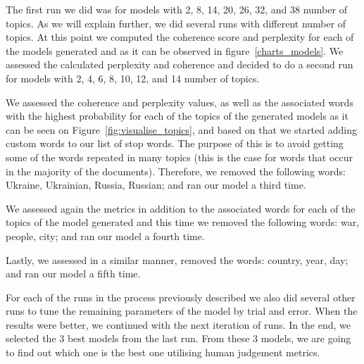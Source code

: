 \documentclass[twoside,12pt,a4paper]{article}
\begin{document}
The first run we did was for models with 2, 8, 14, 20, 26, 32, and 38 number of topics. As we will explain further, we did several runs with different number of topics. At this point we computed the coherence score and perplexity for each of the models generated and as it can be observed in figure~\ref{charts_models}. We assessed the calculated perplexity and coherence and decided to do a second run for models with 2, 4, 6, 8, 10, 12, and 14 number of topics. 

We assessed the coherence and perplexity values, as well as the associated words with the highest probability for each of the topics of the generated models as it can be seen on Figure~\ref{fig:visualise_topics}, and based on that we started adding custom words to our list of stop words. The purpose of this is to avoid getting some of the words repeated in many topics (this is the case for words that occur in the majority of the documents). Therefore, we removed the following words: Ukraine, Ukrainian, Russia, Russian; and ran our model a third time. 

We assessed again the metrics in addition to the associated words for each of the topics of the model generated and this time we removed the following words: war, people, city; and ran our model a fourth time.

Lastly, we assessed in a similar manner, removed the words: country, year, day; and ran our model a fifth time.

For each of the runs in the process previously described we also did several other runs to tune the remaining parameters of the model by trial and error. When the results were better, we continued with the next iteration of runs. In the end, we selected the 3 best models from the last run. From these 3 models, we are going to find out which one is the best one utilising human judgement metrics.\\
\end{document}

